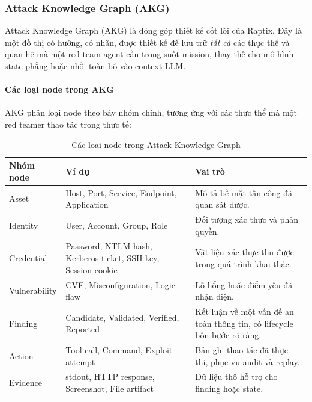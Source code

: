 
\subsubsection{Attack Knowledge Graph (AKG)}
\label{sec:attack-knowledge-graph}

Attack Knowledge Graph (AKG) là đóng góp thiết kế cốt lõi của Raptix. Đây là một đồ thị có hướng, có nhãn, được thiết kế để lưu trữ \emph{tất cả} các thực thể và quan hệ mà một red team agent cần trong suốt mission, thay thế cho mô hình state phẳng hoặc nhồi toàn bộ vào context LLM.

\paragraph{Các loại node trong AKG}

AKG phân loại node theo bảy nhóm chính, tương ứng với các thực thể mà một red teamer thao tác trong thực tế:

\begin{table}[H]
\centering
\caption{Các loại node trong Attack Knowledge Graph}
\label{tab:akg-nodes}
\small
\renewcommand{\arraystretch}{1.3}
\begin{tabular}{|p{2.6cm}|p{4.5cm}|p{8.5cm}|}
\hline
\textbf{Nhóm node} & \textbf{Ví dụ} & \textbf{Vai trò} \\
\hline
Asset & Host, Port, Service, Endpoint, Application & Mô tả bề mặt tấn công đã quan sát được. \\
\hline
Identity & User, Account, Group, Role & Đối tượng xác thực và phân quyền. \\
\hline
Credential & Password, NTLM hash, Kerberos ticket, SSH key, Session cookie & Vật liệu xác thực thu được trong quá trình khai thác. \\
\hline
Vulnerability & CVE, Misconfiguration, Logic flaw & Lỗ hổng hoặc điểm yếu đã nhận diện. \\
\hline
Finding & Candidate, Validated, Verified, Reported & Kết luận về một vấn đề an toàn thông tin, có lifecycle bốn bước rõ ràng. \\
\hline
Action & Tool call, Command, Exploit attempt & Bản ghi thao tác đã thực thi, phục vụ audit và replay. \\
\hline
Evidence & stdout, HTTP response, Screenshot, File artifact & Dữ liệu thô hỗ trợ cho finding hoặc state. \\
\hline
\end{tabular}
\end{table}

